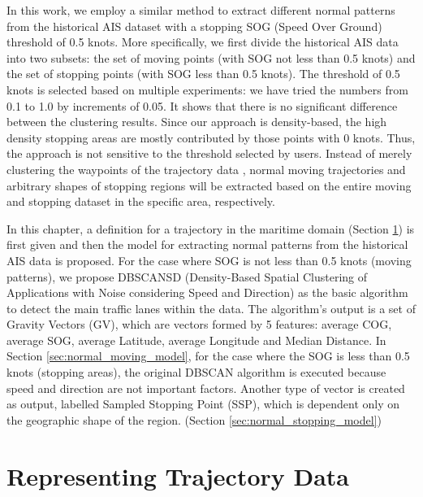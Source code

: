 \documentclass[12pt,glossary]{dalcsthesis}
\begin{document}
In this work, we employ a similar method to extract different normal patterns from the historical AIS dataset with a stopping SOG (Speed Over Ground) threshold of 0.5 knots. More specifically, we first divide the historical AIS data into two subsets: the set of moving points (with SOG not less than 0.5 knots) and the set of stopping points (with SOG less than 0.5 knots). The threshold of 0.5 knots is selected based on multiple experiments: we have tried the numbers from 0.1 to 1.0 by increments of 0.05. It shows that there is no significant difference between the clustering results. Since our approach is density-based, the high density stopping areas are mostly contributed by those points with 0 knots. Thus, the approach is not sensitive to the threshold selected by users. Instead of merely clustering the waypoints of the trajectory data \cite{vespe12}\cite{PallottaFramework}, normal moving trajectories and arbitrary shapes of stopping regions will be extracted based on the entire moving and stopping dataset in the specific area, respectively.

In this chapter, a definition for a trajectory in the maritime domain (Section \ref{sec:trajectory_representation}) is first given and then the model for extracting normal patterns from the historical AIS data is proposed.  %
For the case where SOG is not less than 0.5 knots (moving patterns), we propose DBSCANSD (Density-Based Spatial Clustering of Applications with Noise considering Speed and Direction) as the basic algorithm to detect the main traffic lanes within the data. The algorithm's output is a set of Gravity Vectors (GV), which are vectors formed by 5 features: average COG, average SOG, average Latitude, average Longitude and Median Distance. In Section \ref{sec:normal_moving_model},  for the case where the SOG is less than 0.5 knots (stopping areas), the original DBSCAN \cite{DBScan96} algorithm is executed because speed and direction are not important factors. Another type of vector is created as output, labelled Sampled Stopping Point (SSP), which is dependent only on the geographic shape of the region. (Section \ref{sec:normal_stopping_model}) 

\section{Representing Trajectory Data} \label{sec:trajectory_representation}
\end{document}
